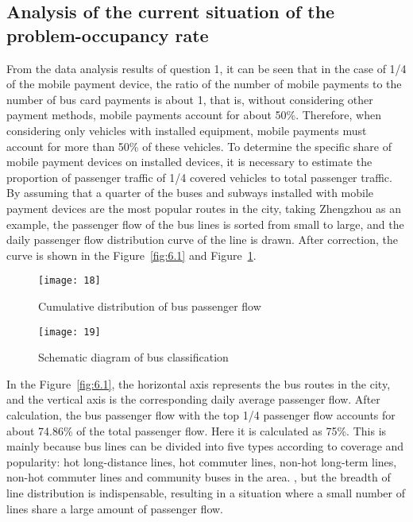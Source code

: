 \documentclass[../mcmpaper]{subfiles}
\begin{document}
\subsection{Analysis of the current situation of the problem-occupancy rate}
From the data analysis results of question 1, it can be seen that in the case of 1/4 of the mobile payment device, the ratio of the number of mobile payments to the number of bus card payments is about 1, that is, without considering other payment methods, mobile payments account for about 50\%. Therefore, when considering only vehicles with installed equipment, mobile payments must account for more than 50\% of these vehicles. To determine the specific share of mobile payment devices on installed devices, it is necessary to estimate the proportion of passenger traffic of 1/4 covered vehicles to total passenger traffic. By assuming that a quarter of the buses and subways installed with mobile payment devices are the most popular routes in the city, taking Zhengzhou as an example, the passenger flow of the bus lines is sorted from small to large, and the daily passenger flow distribution curve of the line is drawn. After correction, the curve is shown in the Figure~\ref{fig:6.1} and Figure~\ref{fig:6.2}.
\begin{figure}[!ht]
\centering
\begin{minipage}[c]{0.48\linewidth}
    \centering
    \texttt{[image: 18]}
    \caption{Cumulative distribution of bus passenger flow}
    \label{fig:6.1}
\end{minipage}
\quad
\begin{minipage}[c]{0.48\linewidth}
    \centering
    \texttt{[image: 19]}
    \caption{Schematic diagram of bus classification}
     \label{fig:6.2}
\end{minipage}
\end{figure}
\par
In the Figure~\ref{fig:6.1}, the horizontal axis represents the bus routes in the city, and the vertical axis is the corresponding daily average passenger flow. After calculation, the bus passenger flow with the top 1/4 passenger flow accounts for about 74.86\% of the total passenger flow. Here it is calculated as 75\%. This is mainly because bus lines can be divided into five types according to coverage and popularity: hot long-distance lines, hot commuter lines, non-hot long-term lines, non-hot commuter lines and community buses in the area. , but the breadth of line distribution is indispensable, resulting in a situation where a small number of lines share a large amount of passenger flow.
\end{document}
